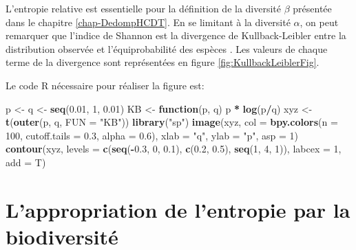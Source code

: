 \documentclass[
  11pt,
  french,
  a4paper,
  extrafontsizes,onecolumn,openright
  ]{memoir}
\newenvironment{Shaded}{\begin{snugshade}}{\end{snugshade}}
\newcommand{\AttributeTok}[1]{\textcolor[rgb]{0.13,0.29,0.53}{#1}}
\newcommand{\ControlFlowTok}[1]{\textcolor[rgb]{0.13,0.29,0.53}{\textbf{#1}}}
\newcommand{\DecValTok}[1]{\textcolor[rgb]{0.00,0.00,0.81}{#1}}
\newcommand{\FloatTok}[1]{\textcolor[rgb]{0.00,0.00,0.81}{#1}}
\newcommand{\FunctionTok}[1]{\textcolor[rgb]{0.13,0.29,0.53}{\textbf{#1}}}
\newcommand{\NormalTok}[1]{#1}
\newcommand{\OtherTok}[1]{\textcolor[rgb]{0.56,0.35,0.01}{#1}}
\newcommand{\SpecialCharTok}[1]{\textcolor[rgb]{0.81,0.36,0.00}{\textbf{#1}}}
\newcommand{\StringTok}[1]{\textcolor[rgb]{0.31,0.60,0.02}{#1}}
\begin{document}
\normalsize

L'entropie relative est essentielle pour la définition de la diversité \(\beta\) présentée dans le chapitre \ref{chap-DedompHCDT}.
En se limitant à la diversité \(\alpha\), on peut remarquer que l'indice de Shannon est la divergence de Kullback-Leibler entre la distribution observée et l'équiprobabilité des espèces \autocite{Marcon2012a}.
Les valeurs de chaque terme de la divergence sont représentées en figure \ref{fig:KullbackLeiblerFig}.

Le code R nécessaire pour réaliser la figure est:

\scriptsize

\begin{Shaded}
\begin{Highlighting}[]
\NormalTok{p }\OtherTok{\textless{}{-}}\NormalTok{ q }\OtherTok{\textless{}{-}} \FunctionTok{seq}\NormalTok{(}\FloatTok{0.01}\NormalTok{, }\DecValTok{1}\NormalTok{, }\FloatTok{0.01}\NormalTok{)}
\NormalTok{KB }\OtherTok{\textless{}{-}} \ControlFlowTok{function}\NormalTok{(p, q) p }\SpecialCharTok{*} \FunctionTok{log}\NormalTok{(p}\SpecialCharTok{/}\NormalTok{q)}
\NormalTok{xyz }\OtherTok{\textless{}{-}} \FunctionTok{t}\NormalTok{(}\FunctionTok{outer}\NormalTok{(p, q, }\AttributeTok{FUN =} \StringTok{"KB"}\NormalTok{))}
\FunctionTok{library}\NormalTok{(}\StringTok{"sp"}\NormalTok{)}
\FunctionTok{image}\NormalTok{(xyz, }\AttributeTok{col =} \FunctionTok{bpy.colors}\NormalTok{(}\AttributeTok{n =} \DecValTok{100}\NormalTok{, }\AttributeTok{cutoff.tails =} \FloatTok{0.3}\NormalTok{, }\AttributeTok{alpha =} \FloatTok{0.6}\NormalTok{),}
    \AttributeTok{xlab =} \StringTok{"q"}\NormalTok{, }\AttributeTok{ylab =} \StringTok{"p"}\NormalTok{, }\AttributeTok{asp =} \DecValTok{1}\NormalTok{)}
\FunctionTok{contour}\NormalTok{(xyz, }\AttributeTok{levels =} \FunctionTok{c}\NormalTok{(}\FunctionTok{seq}\NormalTok{(}\SpecialCharTok{{-}}\FloatTok{0.3}\NormalTok{, }\DecValTok{0}\NormalTok{, }\FloatTok{0.1}\NormalTok{), }\FunctionTok{c}\NormalTok{(}\FloatTok{0.2}\NormalTok{, }\FloatTok{0.5}\NormalTok{), }\FunctionTok{seq}\NormalTok{(}\DecValTok{1}\NormalTok{,}
    \DecValTok{4}\NormalTok{, }\DecValTok{1}\NormalTok{)), }\AttributeTok{labcex =} \DecValTok{1}\NormalTok{, }\AttributeTok{add =}\NormalTok{ T)}
\end{Highlighting}
\end{Shaded}

\normalsize

\section{L'appropriation de l'entropie par la biodiversité}\label{lappropriation-de-lentropie-par-la-biodiversituxe9}
\end{document}
